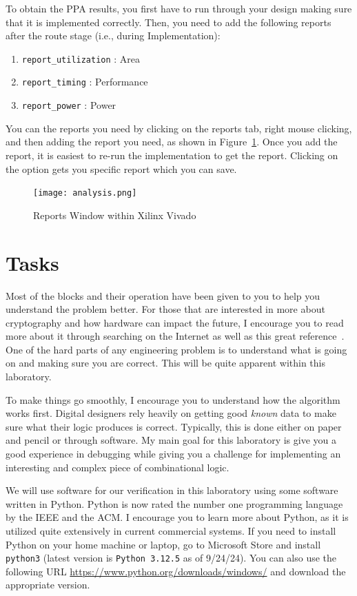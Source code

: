 \documentclass{article}
\begin{document}
To obtain the PPA results, you first have to run through your design
making sure that it is implemented correctly.  Then, you need to add
the following reports after the route stage (i.e., during
Implementation):
\begin{enumerate}
\item \verb!report_utilization! : Area
\item \verb!report_timing! : Performance
\item \verb!report_power! : Power
\end{enumerate}
You can the reports you need by clicking on the reports tab, right
mouse clicking, and then adding the report you need, as shown in
Figure~\ref{reports1.png}.  Once you add the report, it is easiest to
re-run the implementation to get the report.  Clicking on the option
gets you specific report which you can save.
\begin{figure} [b!]
  \centering
  \texttt{[image: analysis.png]}
  \caption{Reports Window within Xilinx Vivado}
  \label{reports1.png}
\end{figure}

  
\section{Tasks}

Most of the blocks and their operation
have been given to you to help you understand the
problem better.
For those that are interested in more about cryptography and how
hardware can impact the future, I encourage you to read more about it
through searching on the Internet as well as this great
reference~\cite{10.5555/1721909}.
One of the hard parts of any engineering problem is
to understand what is going on and making sure you are correct.  This
will be quite apparent within this laboratory.

To make things go
smoothly, I encourage you to understand how the algorithm works first.
Digital designers rely heavily on getting good \textit{known} data to make
sure what their logic produces is correct.  Typically, this is done
either on paper and
pencil or through software.  My main goal for this laboratory is give
you a good experience in debugging while giving you a challenge for
implementing an interesting and complex piece of combinational logic.

We will use software for our verification in this laboratory 
using some software written in Python.  Python is now rated the
number one programming language by the IEEE and the ACM.  I encourage
you to learn more about Python, as it is utilized quite extensively in
current commercial systems.
If you need to install Python on your home machine or laptop, go to
Microsoft Store and install \verb!python3! (latest version 
is \verb!Python 3.12.5! as of 9/24/24).
You can also use the following URL
\url{https://www.python.org/downloads/windows/}
and download the appropriate version.
\end{document}
